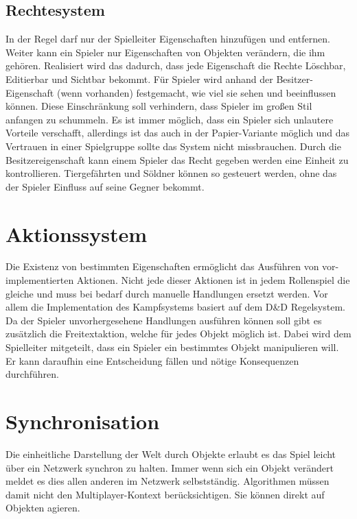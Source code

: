 \subsection{Rechtesystem}
\label{sec:Rechtesystem}
In der Regel darf nur der Spielleiter Eigenschaften hinzufügen und entfernen. Weiter kann ein Spieler nur Eigenschaften von Objekten verändern, die ihm gehören. Realisiert wird das dadurch, dass jede Eigenschaft die Rechte Löschbar, Editierbar und Sichtbar bekommt. Für Spieler wird anhand der Besitzer-Eigenschaft (wenn vorhanden) festgemacht, wie viel sie sehen und beeinflussen können.\newline
Diese Einschränkung soll verhindern, dass Spieler im großen Stil anfangen zu schummeln. Es ist immer möglich, dass ein Spieler sich unlautere Vorteile verschafft, allerdings ist das auch in der Papier-Variante möglich und das Vertrauen in einer Spielgruppe sollte das System nicht missbrauchen.\newline
Durch die Besitzereigenschaft kann einem Spieler das Recht gegeben werden eine Einheit zu kontrollieren. Tiergefährten und Söldner können so gesteuert werden, ohne das der Spieler Einfluss auf seine Gegner bekommt.


\section{Aktionssystem}
\label{sec:Aktionssystem}
Die Existenz von bestimmten Eigenschaften ermöglicht das Ausführen von vor-implementierten Aktionen. Nicht jede dieser Aktionen ist in jedem Rollenspiel die gleiche und muss bei bedarf durch manuelle Handlungen ersetzt werden. Vor allem die Implementation des Kampfsystems basiert auf dem D\&D Regelsystem.\newline
Da der Spieler unvorhergesehene Handlungen ausführen können soll gibt es zusätzlich die Freitextaktion, welche für jedes Objekt möglich ist. Dabei wird dem Spielleiter mitgeteilt, dass ein Spieler ein bestimmtes Objekt manipulieren will. Er kann daraufhin eine Entscheidung fällen und nötige Konsequenzen durchführen.

\section{Synchronisation}
Die einheitliche Darstellung der Welt durch Objekte erlaubt es das Spiel leicht über ein Netzwerk synchron zu halten. Immer wenn sich ein Objekt verändert meldet es dies allen anderen im Netzwerk selbstständig. Algorithmen müssen damit nicht den Multiplayer-Kontext berücksichtigen. Sie können direkt auf Objekten agieren.

